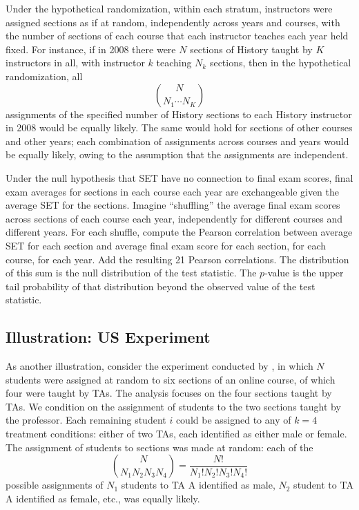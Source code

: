 \documentclass[12pt]{article}
\newcommand{\beq}{\begin{equation}}
\newcommand{\eeq}{\end{equation}}
\begin{document}
Under the hypothetical randomization, within each stratum, instructors
were assigned sections as if at random, independently across years and courses, with
the number of sections of each course that each instructor teaches each year held fixed.
For instance, if in 2008 there were $N$ sections of History taught by $K$ instructors in all,
with instructor $k$ teaching $N_k$ sections, then in the hypothetical randomization,
all
\beq
    {N}\choose{N_1 \cdots N_K}
\eeq
assignments of the specified number of History sections to each History instructor 
in 2008 would be equally likely.
The same would hold for sections of other courses and other years;
each combination of assignments across courses and years would be equally likely,
owing to the assumption that the assignments are independent.

Under the null hypothesis that SET have no connection to final exam scores,
final exam averages for sections in each course each year are exchangeable given the average SET
for the sections.
Imagine ``shuffling'' the average final exam scores across sections of each course
each year, independently
for different courses and different years.
For each shuffle, compute the Pearson correlation between average SET for each section
and average final exam score for each section, for each course, for each year.
Add the resulting 21 Pearson correlations.
The distribution of this sum is the null distribution of the test statistic.
The $p$-value is the upper tail probability of that distribution beyond the observed value of the 
test statistic.

\subsection{Illustration: US Experiment}
As another illustration, consider the experiment conducted by \citet{MacNell2014},
in which $N$ students were assigned at random to six sections of an online course,
of which four were taught by TAs.
The analysis focuses on the four sections taught by TAs.
We condition on the assignment of students to the two sections taught by the professor.
Each remaining student $i$ could be assigned to any of $k=4$ treatment conditions:
either of two TAs, each identified as either male or female.
The assignment of students to sections was made at random: each of the
\beq
 {{N}\choose{N_1 N_2 N_3 N_4}} = \frac{N!}{N_1! N_2! N_3! N_4!}
\eeq
possible assignments of $N_1$ students to TA A identified as male,
$N_2$ student to TA A identified as female, etc., was equally likely.
\end{document}
